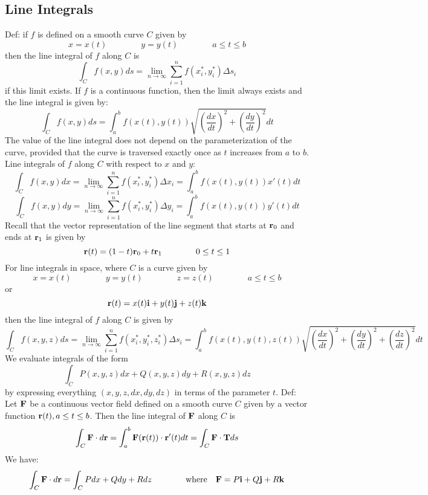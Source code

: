 \documentclass{article}
\begin{document}
    \subsection{Line Integrals}
    \begin{outline}
        \1 Def: if $f$ is defined on a smooth curve $C$ given by \[x=x(t)\qquad\qquad y=y(t)\qquad\qquad a\leq t\leq b\] then the line integral of $f$ along $C$ is \[\int_Cf(x,y)ds=\lim_{n\to\infty}\sum^n_{i=1}f(x^*_i,y^*_i)\Delta s_i\] if this limit exists. 
        \1 If $f$ is a continuous function, then the limit always exists and the line integral is given by: \[\int_Cf(x,y)ds=\int^b_af(x(t),y(t))\sqrt{\left(\dfrac{dx}{dt}\right)^2+\left(\dfrac{dy}{dt}\right)^2}dt\] The value of the line integral does not depend on the parameterization of the curve, provided that the curve is traversed exactly once as $t$ increases from $a$ to $b$. 
        \1 Line integrals of $f$ along $C$ with respect to $x$ and $y$: \[\int_Cf(x,y)dx=\lim_{n\to\infty}\sum^n_{i=1}f(x^*_i,y^*_i)\Delta x_i=\int_a^bf(x(t),y(t))x'(t)dt\] \[\int_Cf(x,y)dy=\lim_{n\to\infty}\sum^n_{i=1}f(x^*_i,y^*_i)\Delta y_i=\int_a^bf(x(t),y(t))y'(t)dt\]
        \1 Recall that the vector representation of the line segment that starts at \(\vb r_0\) and ends at \(\vb r_1\) is given by \[\vb r(t)=(1-t)\vb r_0+t\vb r_1\qquad\qquad 0\leq t\leq 1\]
        \1 For line integrals in space, where $C$ is a curve given by \[x=x(t)\qquad\qquad y=y(t)\qquad\qquad z=z(t)\qquad\qquad a\leq t\leq b\] or \[\vb r(t)=x(t)\vb i+y(t)\vb j+z(t)\vb k\] then the line integral of $f$ along $C$ is given by \[\int_Cf(x,y,z)ds=\lim_{n\to\infty}\sum^n_{i=1}f(x^*_i,y^*_i,z^*_i)\Delta s_i=\int_a^bf(x(t),y(t),z(t))\sqrt{\left(\dfrac{dx}{dt}\right)^2+\left(\dfrac{dy}{dt}\right)^2+\left(\dfrac{dz}{dt}\right)^2}dt\]
        \1 We evaluate integrals of the form \[\int_CP(x,y,z)dx+Q(x,y,z)dy+R(x,y,z)dz\] by expressing everything \((x,y,z,dx,dy,dz)\) in terms of the parameter $t$. 
        \1 Def: Let \(\vb F\) be a continuous vector field defined on a smooth curve $C$ given by a vector function \(\vb r(t),a\leq t\leq b\). Then the line integral of $\vb F$ along $C$ is \[\int_C\vb F\cdot d\vb r=\int_a^b\vb F(\vb r(t))\cdot\vb r'(t)dt=\int_C\vb F\cdot\vb Tds\]
        \1 We have: \[\int_C\vb F\cdot d\vb r=\int_CPdx+Qdy+Rdz\qquad\qquad\text{where}\quad\vb F=P\vb i+Q\vb j+R\vb k\]

    \end{outline}
    
\end{document}
